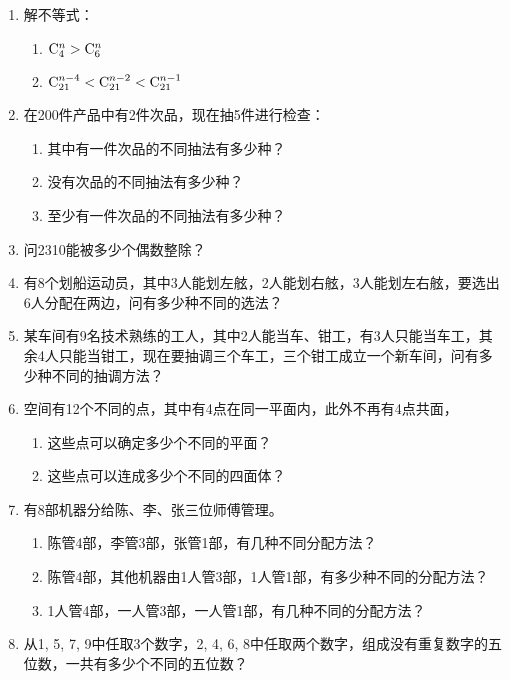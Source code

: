 \begin{enumerate}
\item 解不等式：
\begin{multicols}{2}
\begin{enumerate}[(1)]
    \item ${\rm C}^{n}_{4}>{\rm C}^{n}_{6}$
    \item ${\rm C}^{n-4}_{21}<{\rm C}^{n-2}_{21}<{\rm C}^{n-1}_{21}$
\end{enumerate}
\end{multicols}

\item 在200件产品中有2件次品，现在抽5件进行检查：
\begin{enumerate}[(1)]
\item 其中有一件次品的不同抽法有多少种？
\item 没有次品的不同抽法有多少种？
\item 至少有一件次品的不同抽法有多少种？
\end{enumerate}

\item 问2310能被多少个偶数整除？
\item 有8个划船运动员，其中3人能划左舷，2人能划右舷，3人能划左右舷，要选出6人分配在两边，问有多少种不同的选法？

\item  某车间有9名技术熟练的工人，其中2人能当车、钳工，有3人只能当车工，其余4人只能当钳工，现在要抽调三个车工，三个钳工成立一个新车间，问有多少种不同的抽调方法？
\item  空间有12个不同的点，其中有4点在同一平面内，此外不再有4点共面，
\begin{enumerate}[(1)]
\item  这些点可以确定多少个不同的平面？
\item  这些点可以连成多少个不同的四面体？
\end{enumerate}

\item  有8部机器分给陈、李、张三位师傅管理。
\begin{enumerate}[(1)]
\item 陈管4部，李管3部，张管1部，有几种不同分配方法？
\item 陈管4部，其他机器由1人管3部，1人管1部，有多少种不同的分配方法？
\item 1人管4部，一人管3部，一人管1部，有几种不同的分配方法？
\end{enumerate}

\item  从1, 5, 7, 9中任取3个数字，2, 4, 6, 8中任取两个数字，组成没有重复数字的五位数，一共有多少个不同的五位数？
\end{enumerate}

